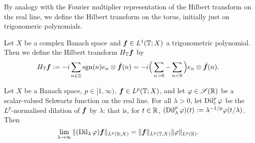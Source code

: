   By analogy with the Fourier multiplier representation of the Hilbert transform on the real line, we define the Hilbert transform on the torus, initially just on trigonomeric polynomials.
  \begin{defn}
    Let $X$ be a complex Banach space and $\bm{f} \in L^1(\mathbb{T};X)$ a trigonometric polynomial.
    Then we define the Hilbert transform $H_{\mathbb{T}}\bm{f}$ by
    \begin{equation*}
      H_{\mathbb{T}} \bm{f} := -i \sum_{n \in \mathbb{Z}} \operatorname{sgn}(n) e_{n} \otimes \hat{\bm{f}}(n) = -i \Big( \sum_{n > 0} - \sum_{n < 0} \Big) e_{n} \otimes \hat{\bm{f}}(n).
    \end{equation*}  
  \end{defn}


  \begin{lem}\label{lem:transference}
    Let $X$ be a Banach space, $p \in [1,\infty)$, $\bm{f} \in L^p(\mathbb{T};X)$, and let $\varphi \in \mathscr{S}(\mathbb{R})$ be a scalar-valued Schwartz function on the real line.
    For all $\lambda > 0$, let $\operatorname{Dil}_{\varepsilon}^{p} \varphi$ be the $L^p$-normalised dilation of $\bm{f}$ by $\lambda$: that is, for $t \in \mathbb{R}$, $(\operatorname{Dil}_{\lambda}^{p}\varphi)(t) := \lambda^{-1/p} \varphi(t/\lambda)$.
    Then
    \begin{equation*}
        \lim_{\lambda \to \infty} \| (\operatorname{Dil}_{\lambda}\varphi) \bm{f} \|_{L^p(\mathbb{R};X)} = \|\bm{f}\|_{L^p(\mathbb{T};X)}\|\varphi\|_{L^p(\mathbb{R})}.
    \end{equation*}
  \end{lem}

